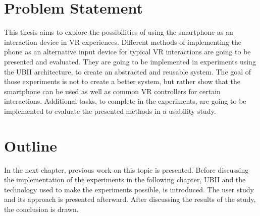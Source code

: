 \section{Problem Statement}\label{section:problem-statement}
This thesis aims to explore the possibilities of using the smartphone as an interaction device in \ac{VR} experiences. Different methods of implementing the phone as an alternative input device for typical \ac{VR} interactions are going to be presented and evaluated. They are going to be implemented in experiments using the \ac{UBII} architecture, to create an abstracted and reusable system. The goal of those experiments is not to create a better system, but rather show that the smartphone can be used as well as common \ac{VR} controllers for certain interactions. Additional tasks, to complete in the experiments, are going to be implemented to evaluate the presented methods in a usability study.


\section{Outline}\label{section:outline}
In the next chapter, previous work on this topic is presented. Before discussing the implementation of the experiments in the following chapter, \ac{UBII} and the technology used to make the experiments possible, is introduced. The user study and its approach is presented afterward. After discussing the results of the study, the conclusion is drawn.